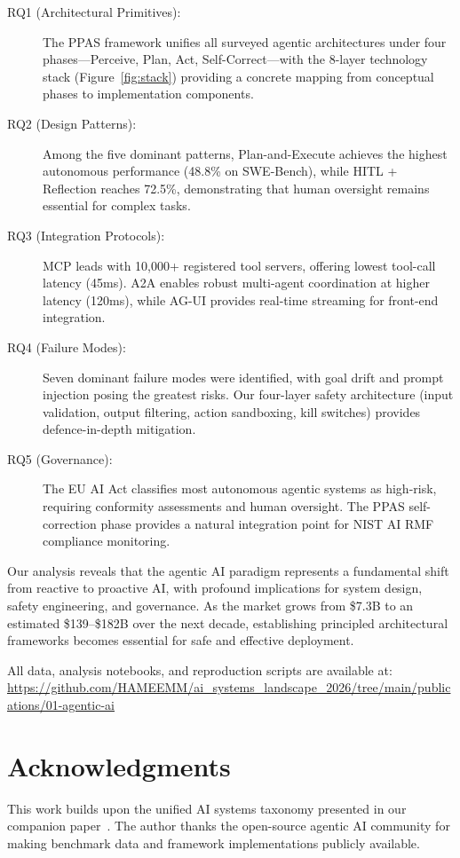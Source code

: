 \documentclass[12pt, a4paper]{article}
\begin{document}
\begin{description}
    \item[RQ1 (Architectural Primitives):] The PPAS framework unifies all surveyed agentic architectures under four phases---Perceive, Plan, Act, Self-Correct---with the 8-layer technology stack (Figure~\ref{fig:stack}) providing a concrete mapping from conceptual phases to implementation components.
    \item[RQ2 (Design Patterns):] Among the five dominant patterns, Plan-and-Execute achieves the highest autonomous performance (48.8\% on SWE-Bench), while HITL + Reflection reaches 72.5\%, demonstrating that human oversight remains essential for complex tasks.
    \item[RQ3 (Integration Protocols):] MCP leads with 10,000+ registered tool servers, offering lowest tool-call latency (45ms). A2A enables robust multi-agent coordination at higher latency (120ms), while AG-UI provides real-time streaming for front-end integration.
    \item[RQ4 (Failure Modes):] Seven dominant failure modes were identified, with goal drift and prompt injection posing the greatest risks. Our four-layer safety architecture (input validation, output filtering, action sandboxing, kill switches) provides defence-in-depth mitigation.
    \item[RQ5 (Governance):] The EU AI Act classifies most autonomous agentic systems as high-risk, requiring conformity assessments and human oversight. The PPAS self-correction phase provides a natural integration point for NIST AI RMF compliance monitoring.
\end{description}

Our analysis reveals that the agentic AI paradigm represents a fundamental shift from reactive to proactive AI, with profound implications for system design, safety engineering, and governance. As the market grows from \$7.3B to an estimated \$139--\$182B over the next decade, establishing principled architectural frameworks becomes essential for safe and effective deployment.

All data, analysis notebooks, and reproduction scripts are available at: \\
\url{https://github.com/HAMEEMM/ai_systems_landscape_2026/tree/main/publications/01-agentic-ai}

\section*{Acknowledgments}
This work builds upon the unified AI systems taxonomy presented in our companion paper~\citep{mahdi2026taxonomy}. The author thanks the open-source agentic AI community for making benchmark data and framework implementations publicly available.
\end{document}
